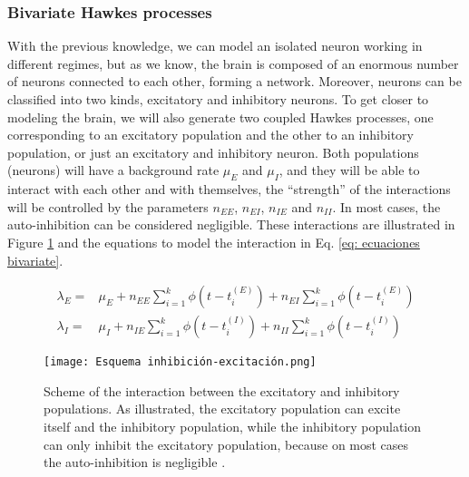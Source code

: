 \subsubsection{Bivariate Hawkes processes} \label{subsubsec:Coupled_Hawkes_processes}
With the previous knowledge, we can model an isolated neuron working in different regimes, but as we know, the brain is composed of an enormous number of neurons connected to each 
other, forming a network. Moreover, neurons can be classified into two kinds, excitatory and inhibitory neurons. To get closer to modeling the brain, we will also generate two coupled
Hawkes processes, one corresponding to an excitatory population and the other to an inhibitory population, or just an excitatory and inhibitory neuron. 
Both populations (neurons) will have a background rate  $\mu_E$ and $\mu_I$, and they will be able to interact with each other and with themselves, the ``strength'' of the interactions 
will be controlled by the parameters $n_{EE}$, $n_{EI}$, $n_{IE}$ and $n_{II}$. In most cases, the auto-inhibition can be considered negligible. 
These interactions are illustrated in Figure \ref{f: Hawkes coupled} and the equations to model the interaction in Eq. \ref{eq: ecuaciones bivariate}.

\begin{equation}
    \begin{split}
        \lambda_E =& \mu_E + n_{EE}\sum_{i=1}^{k}\phi \left( t-t_i^{(E)} \right) + n_{EI}\sum_{i=1}^{k}\phi \left( t-t_i^{(E)}\right)\\
        \lambda_I =& \mu_I + n_{IE}\sum_{i=1}^{k}\phi \left( t-t_i^{(I)} \right) + n_{II}\sum_{i=1}^{k}\phi \left( t-t_i^{(I)} \right)
    \end{split}
    \label{eq: ecuaciones bivariate}
\end{equation}

\begin{figure}[H]
\centering
\texttt{[image: Esquema inhibición-excitación.png]}
\caption{Scheme of the interaction between the excitatory and inhibitory populations. As illustrated, the excitatory population can excite itself and the inhibitory population, while the
inhibitory population can only inhibit the excitatory population, because on most cases the auto-inhibition is negligible \cite{kalle2018growing}.}
\label{f: Hawkes coupled}
\end{figure}

